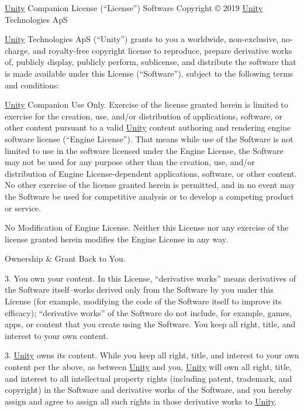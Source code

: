 \mbox{\hyperlink{namespace_unity}{Unity}} Companion License (“\+License”) Software Copyright © 2019 \mbox{\hyperlink{namespace_unity}{Unity}} Technologies ApS

\mbox{\hyperlink{namespace_unity}{Unity}} Technologies ApS (“\+Unity”) grants to you a worldwide, non-\/exclusive, no-\/charge, and royalty-\/free copyright license to reproduce, prepare derivative works of, publicly display, publicly perform, sublicense, and distribute the software that is made available under this License (“\+Software”), subject to the following terms and conditions\+:


\begin{DoxyEnumerate}
\item \mbox{\hyperlink{namespace_unity}{Unity}} Companion Use Only. Exercise of the license granted herein is limited to exercise for the creation, use, and/or distribution of applications, software, or other content pursuant to a valid \mbox{\hyperlink{namespace_unity}{Unity}} content authoring and rendering engine software license (“\+Engine License”). That means while use of the Software is not limited to use in the software licensed under the Engine License, the Software may not be used for any purpose other than the creation, use, and/or distribution of Engine License-\/dependent applications, software, or other content. No other exercise of the license granted herein is permitted, and in no event may the Software be used for competitive analysis or to develop a competing product or service.
\item No Modification of Engine License. Neither this License nor any exercise of the license granted herein modifies the Engine License in any way.
\item Ownership \& Grant Back to You.
\end{DoxyEnumerate}

3. You own your content. In this License, “derivative works” means derivatives of the Software itself--works derived only from the Software by you under this License (for example, modifying the code of the Software itself to improve its efficacy); “derivative works” of the Software do not include, for example, games, apps, or content that you create using the Software. You keep all right, title, and interest to your own content.

3. \mbox{\hyperlink{namespace_unity}{Unity}} owns its content. While you keep all right, title, and interest to your own content per the above, as between \mbox{\hyperlink{namespace_unity}{Unity}} and you, \mbox{\hyperlink{namespace_unity}{Unity}} will own all right, title, and interest to all intellectual property rights (including patent, trademark, and copyright) in the Software and derivative works of the Software, and you hereby assign and agree to assign all such rights in those derivative works to \mbox{\hyperlink{namespace_unity}{Unity}}.

